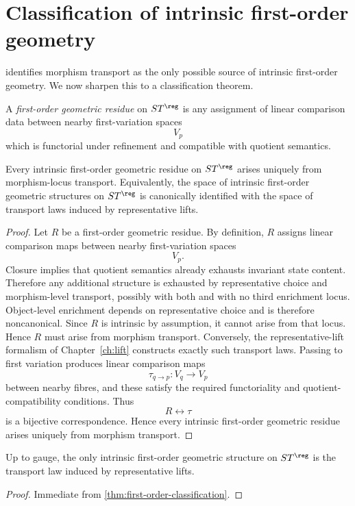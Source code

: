 \section{Classification of intrinsic first-order geometry}
\label{sec:first-order-classification}
 identifies morphism transport as the only
possible source of intrinsic first-order geometry.  We now sharpen this
to a classification theorem.
\begin{definition}
	A \emph{first-order geometric residue} on \(ST^{\reg}\) is any
	assignment of linear comparison data between nearby first-variation
	spaces
	\[
		V_p
	\]
	which is functorial under refinement and compatible with quotient
	semantics.
\end{definition}
\begin{theorem}
	\label{thm:first-order-classification}
	Every intrinsic first-order geometric residue on \(ST^{\reg}\) arises
	uniquely from morphism-locus transport.
	Equivalently, the space of intrinsic first-order geometric structures on
	\(ST^{\reg}\) is canonically identified with the space of transport laws
	induced by representative lifts.
\end{theorem}
\begin{proof}
	Let \(R\) be a first-order geometric residue.  By definition, \(R\)
	assigns linear comparison maps between nearby first-variation spaces
	\[
		V_p.
	\]
	Closure implies that quotient semantics already exhausts invariant
	state content.
	Therefore any additional structure is exhausted by representative
	choice and morphism-level transport, possibly with both and with no
	third enrichment locus.
	Object-level enrichment depends on representative choice and is
	therefore noncanonical.
	Since \(R\) is intrinsic by assumption, it cannot arise from that
	locus.
	Hence \(R\) must arise from morphism transport.
	Conversely, the representative-lift formalism of
	Chapter~\ref{ch:lift} constructs exactly such transport laws.  Passing
	to first variation produces linear comparison maps
	\[
		\tau_{q\to p}:V_q\to V_p
	\]
	between nearby fibres, and these satisfy the required functoriality and
	quotient-compatibility conditions.
	Thus
	\[
		R\longleftrightarrow \tau
	\]
	is a bijective correspondence.  Hence every intrinsic first-order
	geometric residue arises uniquely from morphism transport.
\end{proof}
\begin{corollary}
	Up to gauge, the only intrinsic first-order geometric structure on
	\(ST^{\reg}\) is the transport law induced by representative lifts.
\end{corollary}
\begin{proof}
	Immediate from \cref{thm:first-order-classification}.
\end{proof}
